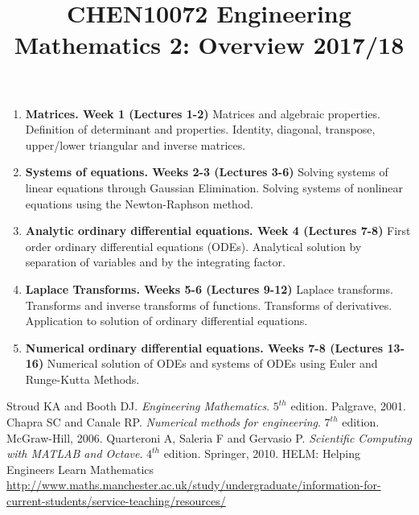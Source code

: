 \documentclass[12pt]{article}
\title{\vspace{-2cm}CHEN10072 Engineering Mathematics 2: Overview 2017/18}
\date{\vspace{-1cm}}
\author{}
\begin{document}
\maketitle

\begin{enumerate}
\item {\bf Matrices. Week 1 (Lectures 1-2) } Matrices and algebraic properties. Definition of determinant and properties. Identity, diagonal, transpose, upper/lower triangular and inverse matrices.
\item {\bf Systems of equations. Weeks 2-3 (Lectures 3-6)} Solving systems of linear equations through Gaussian Elimination. Solving systems of nonlinear equations using the Newton-Raphson method.
\item {\bf Analytic ordinary differential equations. Week 4 (Lectures 7-8)} First order ordinary differential equations (ODEs). Analytical solution by separation of variables and by the integrating factor.
\item {\bf Laplace Transforms. Weeks 5-6 (Lectures 9-12)} Laplace transforms. Transforms and inverse transforms of functions. Transforms of derivatives. Application to solution of ordinary differential equations.
\item {\bf Numerical ordinary differential equations. Weeks 7-8 (Lectures 13-16)}  Numerical solution of ODEs and systems of ODEs using Euler and Runge-Kutta Methods.
\end{enumerate}


\begin{thebibliography}{9}
 Stroud KA and Booth DJ. \textit{Engineering Mathematics}. $5^{th}$ edition. Palgrave, 2001.
 Chapra SC and Canale RP. \textit{Numerical methods for engineering}. $7^{th}$ edition. McGraw-Hill, 2006.
 Quarteroni A, Saleria F and Gervasio P. \textit{Scientific Computing with MATLAB and Octave}. $4^{th}$ edition. Springer, 2010.
 HELM: Helping Engineers Learn Mathematics \url{http://www.maths.manchester.ac.uk/study/undergraduate/information-for-current-students/service-teaching/resources/}
\end{thebibliography}
\end{document}
